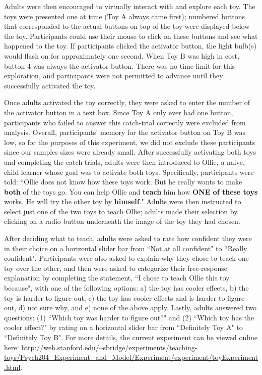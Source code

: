 \documentclass[10pt,letterpaper]{article}
\begin{document}
Adults were then encouraged to virtually interact with and explore each toy. The toys were presented one at time (Toy A always came first); numbered buttons that corresponded to the actual buttons on top of the toy were displayed below the toy. Participants could use their mouse to click on these buttons and see what happened to the toy. If participants clicked the activator button, the light bulb(s) would flash on for approximately one second. When Toy B was high in cost, button 4 was always the activator button. There was no time limit for this exploration, and participants were not permitted to advance until they successfully activated the toy. 

Once adults activated the toy correctly, they were asked to enter the number of the activator button in a text box. Since Toy A only ever had one button, participants who failed to answer this catch-trial correctly were excluded from analysis. Overall, participants' memory for the activator button on Toy B was low, so for the purposes of this experiment, we did not exclude these participants since our samples sizes were already small. After successfully activating both toys and completing the catch-trials, adults were then introduced to Ollie, a naive, child learner whose goal was to activate both toys. Specifically, participants were told: ``Ollie does not know how these toys work. But he really wants to make \textbf{both} of the toys go. You can help Ollie and \textbf{teach} him how \textbf{ONE of these toys} works. He will try the other toy by \textbf{himself}." Adults were then instructed to select just one of the two toys to teach Ollie; adults made their selection by clicking on a radio button underneath the image of the toy they had chosen. 

After deciding what to teach, adults were asked to rate how confident they were in their choice on a horizontal slider bar from ``Not at all confident" to ``Really confident". Participants were also asked to explain why they chose to teach one toy over the other, and then were asked to categorize their free-response explanation by completing the statement, ``I chose to teach Ollie this toy because", with one of the following options: a) the toy has cooler effects, b) the toy is harder to figure out, c) the toy has cooler effects and is harder to figure out, d) not sure why, and e) none of the above apply. Lastly, adults answered two questions: (1) ``Which toy was harder to figure out?" and (2) ``Which toy has the cooler effect?" by rating on a horizontal slider bar from ``Definitely Toy A" to ``Definitely Toy B". For more details, the current experiment can be viewed online here:  \url{http://web.stanford.edu/~sbridge/experiments/teaching-toys/Psych204_Experiment_and_Model/Experiment/experiment/toyExperiment.html}.
\end{document}

